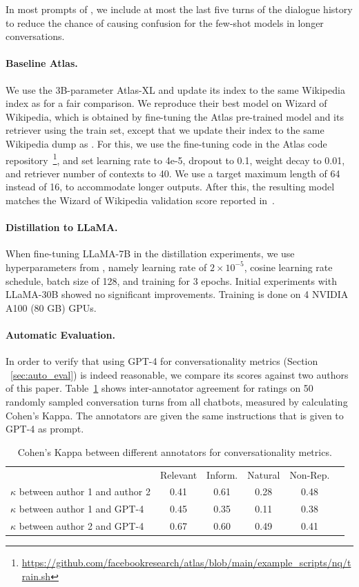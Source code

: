 In most prompts of \system, we include at most the last five turns of the dialogue history to reduce the chance of causing confusion for the few-shot models in longer conversations.

\paragraph{Baseline Atlas.}
We use the 3B-parameter Atlas-XL and update its index to the same Wikipedia index as \system for a fair comparison.
We reproduce their best model on Wizard of Wikipedia, which is obtained by fine-tuning the Atlas pre-trained model and its retriever using the train set, except that we update their index to the same Wikipedia dump as \system. For this, we use the fine-tuning code in the Atlas code repository~\footnote{\url{https://github.com/facebookresearch/atlas/blob/main/example_scripts/nq/train.sh}}, and set learning rate to 4e-5, dropout to 0.1, weight decay to 0.01, and retriever number of contexts to 40. We use a target maximum length of 64 instead of 16, to accommodate longer outputs.
After this, the resulting model matches the Wizard of Wikipedia validation score reported in~\citet{izacard2022atlas}.

\paragraph{Distillation to LLaMA.}
When fine-tuning LLaMA-7B in the distillation experiments, we use hyperparameters from \cite{alpaca}, namely learning rate of $2\times 10^{-5}$, cosine learning rate schedule, batch size of 128, and training for 3 epochs.
Initial experiments with LLaMA-30B showed no significant improvements.
Training is done on 4 NVIDIA A100 (80 GB) GPUs.


\paragraph{Automatic Evaluation.}
\label{appendix:automatic_eval}
In order to verify that using GPT-4 for conversationality metrics (Section ~\ref{sec:auto_eval}) is indeed reasonable, we compare its scores against two authors of this paper. Table~\ref{table:kappa} shows inter-annotator agreement for ratings on 50 randomly sampled conversation turns from all chatbots, measured by calculating Cohen's Kappa. The annotators are given the same instructions that is given to GPT-4 as prompt.

\begin{table}[ht]
\centering
\begin{tabular}{lccccc} 
 \hline
& Relevant & Inform. & Natural & Non-Rep. \\
 $\kappa$ between author 1 and author 2 & 0.41 & 0.61 & 0.28 & 0.48 \\
 $\kappa$ between author 1 and GPT-4 & 0.45 & 0.35 & 0.11 & 0.38 \\
 $\kappa$ between author 2 and GPT-4 & 0.67 & 0.60 & 0.49 & 0.41 \\
 \hline

\end{tabular}
\caption{Cohen's Kappa between different annotators for conversationality metrics.}
\label{table:kappa}
\end{table}


